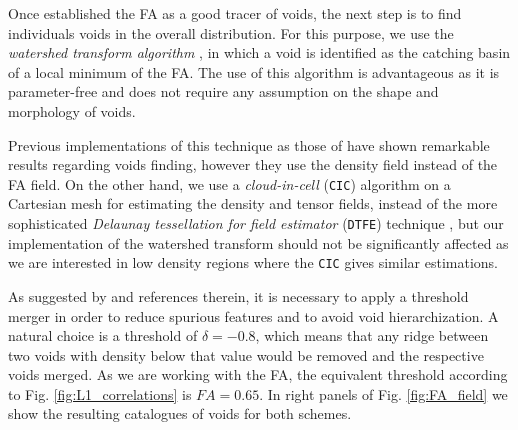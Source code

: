 \documentclass[a4,useAMS,usenatbib,usegraphicx]{mn2e}
\begin{document}
Once established the FA as a good tracer of voids, the next step is to
find individuals voids in the overall distribution. For this purpose, we
use the \textit{watershed transform algorithm} \citep{Beucher79,Beucher93}, 
in which a void is identified as the catching basin of a local minimum of
the FA. The use of this algorithm is advantageous as it is parameter-free 
and does not require any assumption on the shape and morphology of voids. 


Previous implementations of this technique as those of \citet{Platen07,
Neyrinck08} have shown remarkable results regarding voids finding, however
they use the density field instead of the FA field. On the other hand, we 
use a \textit{cloud-in-cell} (\texttt{CIC}) algorithm on a Cartesian mesh for 
estimating the density and tensor fields, instead of the more sophisticated 
\textit{Delaunay tessellation for field estimator} (\texttt{DTFE}) technique 
\citep{Schaap00}, but our implementation of the watershed transform should 
not be significantly affected as we are interested in low density regions 
where the \texttt{CIC} gives similar estimations.


As suggested by \citet{Platen07} and references therein, it is necessary to
apply a threshold merger in order to reduce spurious features and to avoid 
void hierarchization. A natural choice is a threshold of $\delta = -0.8$, 
which means that any ridge between two voids with density below that value
would be removed and the respective voids merged. As we are working with the
FA, the equivalent threshold according to Fig. \ref{fig:L1_correlations} is
$FA = 0.65$. In right panels of Fig. \ref{fig:FA_field} we show the resulting
catalogues of voids for both schemes.


 

\end{document}
